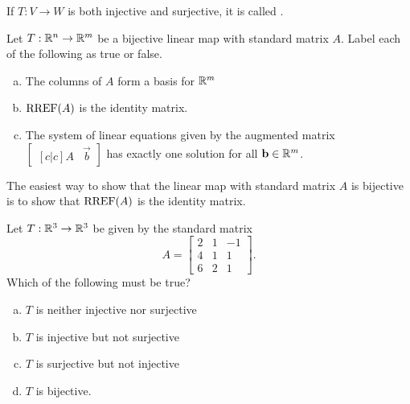 \begin{applicationActivities}
\begin{definition}
If \(T: V \rightarrow W\) is both injective and surjective, it is called .
\end{definition}

\begin{activity}{5}
Let $T: \mathbb{R}^n \rightarrow \mathbb{R}^m$ be a bijective linear map with
standard matrix $A$. Label each of the following as true or false.
\begin{enumerate}[(a)]
\item The columns of $A$ form a basis for $\mathbb{R}^m$
\item $\operatorname{RREF}(A)$ is the identity matrix.
\item The system of linear equations given by the augmented matrix $\begin{bmatrix}[c|c] A & \vec{b} \end{bmatrix}$ has exactly one solution
for all \(\mathbf b \in \mathbb{R}^m\).
\end{enumerate}
\end{activity}

\begin{observation}
  The easiest way to show that the linear map with standard matrix \(A\)
  is bijective is to show that \(\operatorname{RREF}(A)\) is the identity matrix.
\end{observation}

\begin{activity}{3}
Let $T: \mathbb{R}^3 \rightarrow \mathbb{R}^3$ be given by the standard matrix $$A=\begin{bmatrix} 2&1&-1 \\ 4&1&1 \\ 6&2&1\end{bmatrix}.$$ Which of the following must be true?
\begin{enumerate}[(a)]
\item $T$ is neither injective nor surjective
\item $T$ is injective but not surjective
\item $T$ is surjective but not injective
\item $T$ is bijective.
\end{enumerate}
\end{activity}


\end{applicationActivities}
